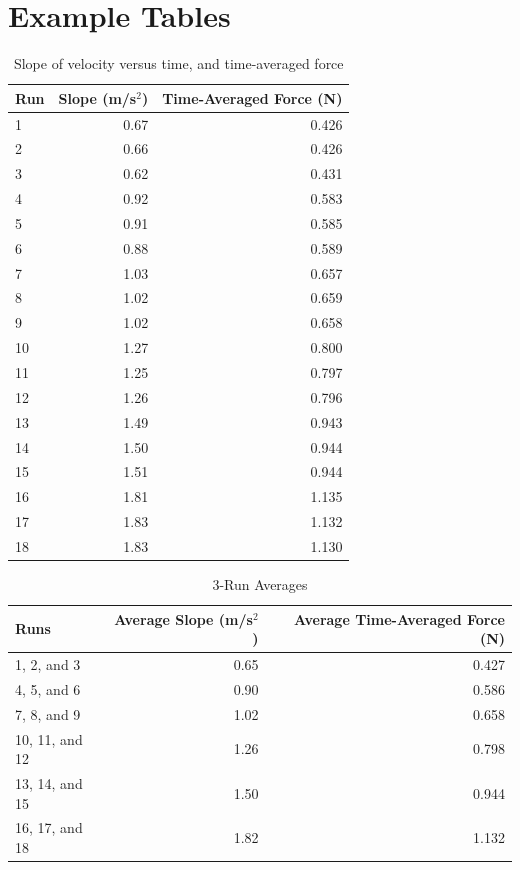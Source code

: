 \section{Example Tables}
%
\begin{table}[ht]
    \centering
    \begin{tabular}{l|r|r}
        \textbf{Run} & \textbf{Slope} (m/s$^{2}$) & \textbf{Time-Averaged Force} (N) \\
        \hline
        1 & 0.67 & 0.426 \\
        2 & 0.66 & 0.426 \\
        3 & 0.62 & 0.431 \\
        \hline
        4 & 0.92 & 0.583 \\
        5 & 0.91 & 0.585 \\
        6 & 0.88 & 0.589 \\
        \hline
        7 & 1.03 & 0.657 \\
        8 & 1.02 & 0.659 \\
        9 & 1.02 & 0.658 \\
        \hline
        10 & 1.27 & 0.800 \\
        11 & 1.25 & 0.797 \\
        12 & 1.26 & 0.796 \\
        \hline
        13 & 1.49 & 0.943 \\
        14 & 1.50 & 0.944 \\
        15 & 1.51 & 0.944 \\
        \hline
        16 & 1.81 & 1.135 \\
        17 & 1.83 & 1.132 \\
        18 & 1.83 & 1.130 \\
        \hline
    \end{tabular}
    \caption{Slope of velocity versus time, and time-averaged force}
    \label{table:04.results}
\end{table}
%
\begin{table}[ht]
    \centering
    \begin{tabular}{l|r|r}
        \textbf{Runs} & \textbf{Average Slope} (m/s$^{2}$) & \textbf{Average Time-Averaged Force} (N) \\
        \hline
        1, 2, and 3 & 0.65 & 0.427 \\
        4, 5, and 6 & 0.90 & 0.586 \\
        7, 8, and 9 & 1.02 & 0.658 \\
        10, 11, and 12 & 1.26 & 0.798 \\
        13, 14, and 15 & 1.50 & 0.944 \\
        16, 17, and 18 & 1.82 & 1.132 \\
        \hline
    \end{tabular}
    \caption{3-Run Averages}
    \label{table:04.averages}
\end{table}
